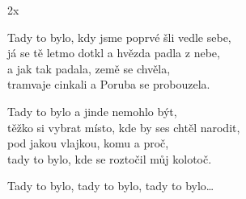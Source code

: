 \cho{} 2x

\ve{}
Tady to bylo, kdy jsme poprvé šli vedle sebe,\\
já se tě letmo dotkl a hvězda padla z nebe,\\
a jak tak padala, země se chvěla,\\
tramvaje cinkali a Poruba se probouzela.

Tady to bylo a jinde nemohlo být,\\
těžko si vybrat místo, kde by ses chtěl narodit,\\
pod jakou vlajkou, komu a proč,\\
tady to bylo, kde se roztočil můj kolotoč.

\re{*:}
Tady to bylo, tady to bylo, tady to bylo\ldots{}

\cho{}

\esong{}